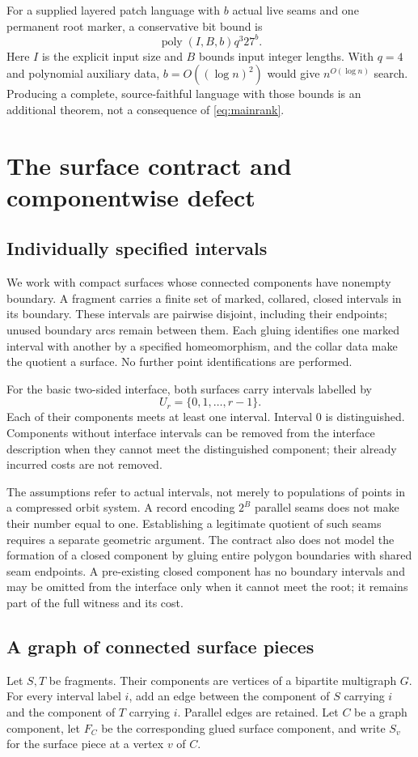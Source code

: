 \documentclass[11pt,letterpaper]{article}
\theoremstyle{definition}
\newcommand{\poly}{\operatorname{poly}}
\begin{document}
For a supplied layered patch language with $b$ actual live seams and one permanent root marker, a conservative bit bound is
\begin{equation}
 \poly(I,B,b)q^3 27^b.\label{eq:mainruntime}
\end{equation}
Here $I$ is the explicit input size and $B$ bounds input integer lengths. With $q=4$ and polynomial auxiliary data, $b=O((\log n)^2)$ would give $n^{O(\log n)}$ search. Producing a complete, source-faithful language with those bounds is an additional theorem, not a consequence of \eqref{eq:mainrank}.

\section{The surface contract and componentwise defect}
\subsection{Individually specified intervals}
We work with compact surfaces whose connected components have nonempty boundary. A fragment carries a finite set of marked, collared, closed intervals in its boundary. These intervals are pairwise disjoint, including their endpoints; unused boundary arcs remain between them. Each gluing identifies one marked interval with another by a specified homeomorphism, and the collar data make the quotient a surface. No further point identifications are performed.

For the basic two-sided interface, both surfaces carry intervals labelled by
\[
 U_r=\{0,1,\ldots,r-1\}.
\]
Each of their components meets at least one interval. Interval $0$ is distinguished. Components without interface intervals can be removed from the interface description when they cannot meet the distinguished component; their already incurred costs are not removed.

The assumptions refer to actual intervals, not merely to populations of points in a compressed orbit system. A record encoding $2^B$ parallel seams does not make their number equal to one. Establishing a legitimate quotient of such seams requires a separate geometric argument. The contract also does not model the formation of a closed component by gluing entire polygon boundaries with shared seam endpoints. A pre-existing closed component has no boundary intervals and may be omitted from the interface only when it cannot meet the root; it remains part of the full witness and its cost.

\subsection{A graph of connected surface pieces}
Let $S,T$ be fragments. Their components are vertices of a bipartite multigraph $G$. For every interval label $i$, add an edge between the component of $S$ carrying $i$ and the component of $T$ carrying $i$. Parallel edges are retained. Let $C$ be a graph component, let $F_C$ be the corresponding glued surface component, and write $S_v$ for the surface piece at a vertex $v$ of $C$.
\end{document}
